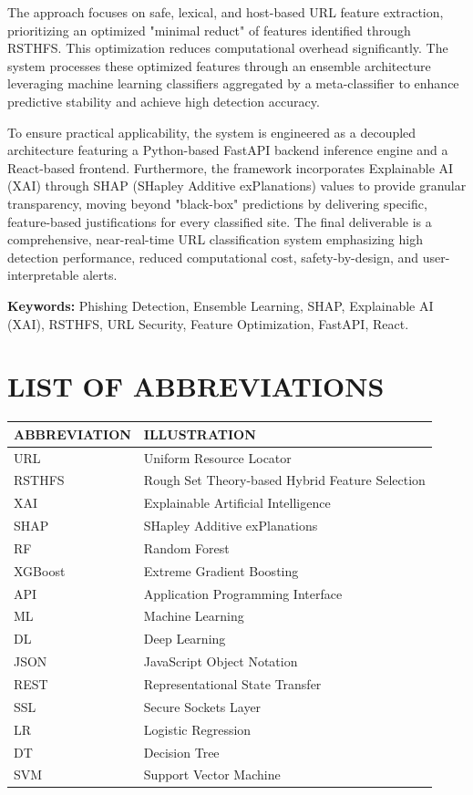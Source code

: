 \documentclass[12pt]{report}
\begin{document}
The approach focuses on safe, lexical, and host-based URL feature extraction, prioritizing an optimized "minimal reduct" of features identified through RSTHFS. This optimization reduces computational overhead significantly. The system processes these optimized features through an ensemble architecture leveraging machine learning classifiers aggregated by a meta-classifier to enhance predictive stability and achieve high detection accuracy.

To ensure practical applicability, the system is engineered as a decoupled architecture featuring a Python-based FastAPI backend inference engine and a React-based frontend. Furthermore, the framework incorporates Explainable AI (XAI) through SHAP (SHapley Additive exPlanations) values to provide granular transparency, moving beyond "black-box" predictions by delivering specific, feature-based justifications for every classified site. The final deliverable is a comprehensive, near-real-time URL classification system emphasizing high detection performance, reduced computational cost, safety-by-design, and user-interpretable alerts.

\vspace{0.5cm}
\noindent \textbf{Keywords:} Phishing Detection, Ensemble Learning, SHAP, Explainable AI (XAI), RSTHFS, URL Security, Feature Optimization, FastAPI, React.

\tableofcontents
\listoffigures
\listoftables

\chapter*{LIST OF ABBREVIATIONS}
\begin{table}[H]
\centering
\begin{tabular}{|l|l|}
\hline
\textbf{ABBREVIATION} & \textbf{ILLUSTRATION} \\ \hline
URL & Uniform Resource Locator \\ \hline
RSTHFS & Rough Set Theory-based Hybrid Feature Selection \\ \hline
XAI & Explainable Artificial Intelligence \\ \hline
SHAP & SHapley Additive exPlanations \\ \hline
RF & Random Forest \\ \hline
XGBoost & Extreme Gradient Boosting \\ \hline
API & Application Programming Interface \\ \hline
ML & Machine Learning \\ \hline
DL & Deep Learning \\ \hline
JSON & JavaScript Object Notation \\ \hline
REST & Representational State Transfer \\ \hline
SSL & Secure Sockets Layer \\ \hline
LR & Logistic Regression \\ \hline
DT & Decision Tree \\ \hline
SVM & Support Vector Machine \\ \hline
\end{tabular}
\end{table}
\clearpage
\end{document}
